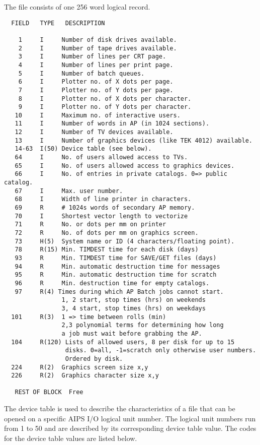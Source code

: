    The file consists of one 256 word logical record.

\begin{verbatim}
  FIELD   TYPE   DESCRIPTION

    1     I     Number of disk drives available.
    2     I     Number of tape drives available.
    3     I     Number of lines per CRT page.
    4     I     Number of lines per print page.
    5     I     Number of batch queues.
    6     I     Plotter no. of X dots per page.
    7     I     Plotter no. of Y dots per page.
    8     I     Plotter no. of X dots per character.
    9     I     Plotter no. of Y dots per character.
   10     I     Maximum no. of interactive users.
   11     I     Number of words in AP (in 1024 sections).
   12     I     Number of TV devices available.
   13     I     Number of graphics devices (like TEK 4012) available.
   14-63  I(50) Device table (see below).
   64     I     No. of users allowed access to TVs.
   65     I     No. of users allowed access to graphics devices.
   66     I     No. of entries in private catalogs. 0=> public catalog.
   67     I     Max. user number.
   68     I     Width of line printer in characters.
   69     R     # 1024s words of secondary AP memory.
   70     I     Shortest vector length to vectorize
   71     R     No. or dots per mm on printer
   72     R     No. of dots per mm on graphics screen.
   73     H(5)  System name or ID (4 characters/floating point).
   78     R(15) Min. TIMDEST time for each disk (days)
   93     R     Min. TIMDEST time for SAVE/GET files (days)
   94     R     Min. automatic destruction time for messages
   95     R     Min. automatic destruction time for scratch
   96     R     Min. destruction time for empty catalogs.
   97     R(4) Times during which AP Batch jobs cannot start.
                1, 2 start, stop times (hrs) on weekends
                3, 4 start, stop times (hrs) on weekdays
  101     R(3)  1 => time between rolls (min)
                2,3 polynomial terms for determining how long
                a job must wait before grabbing the AP.
  104     R(120) Lists of allowed users, 8 per disk for up to 15
                 disks. 0=all, -1=scratch only otherwise user numbers.
                 Ordered by disk.
  224     R(2)  Graphics screen size x,y
  226     R(2)  Graphics character size x,y

   REST OF BLOCK  Free
\end{verbatim}

   The device table is used to describe the characteristics of a file
that can be opened on a specific AIPS I/O logical unit number.  The
logical unit numbers run from 1 to 50 and are described by its
corresponding device table value.  The codes for the device table
values are listed below.

